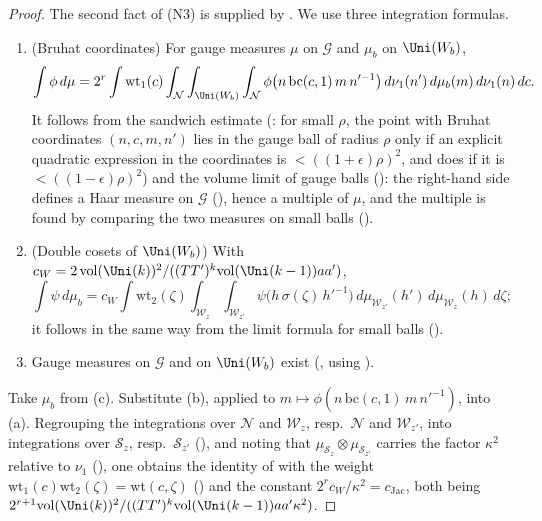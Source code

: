 \begin{proof}
The second fact of (N3) is supplied by . We use three integration formulas.
\begin{enumerate}[label=(\alph*)]
\item (Bruhat coordinates) For gauge measures $\mu$ on $\mathcal G$ and $\mu_b$ on $\Uni(W_b)$,
\[
\int\phi\,d\mu=2^r\int\mathrm{wt}_1(c)\int_{\mathcal N}\int_{\Uni(W_b)}\int_{\mathcal N}\phi\bigl(n\,\mathrm{bc}(c,1)\,m\,
n'^{-1}\bigr)\,d\nu_1(n')\,d\mu_b(m)\,d\nu_1(n)\,dc .
\]
It follows from the sandwich estimate (: for small $\rho$, the point with Bruhat
coordinates $(n,c,m,n')$ lies in the gauge ball of radius $\rho$ only if an explicit quadratic expression in the coordinates
is $<((1+\epsilon)\rho)^2$, and does if it is $<((1-\epsilon)\rho)^2$) and the volume limit of gauge balls
(): the right-hand side defines a Haar measure on $\mathcal G$
(), hence a multiple of $\mu$, and the multiple is found by comparing the two
measures on small balls ().
\item (Double cosets of $\Uni(W_b)$) With $c_W=2\,\mathrm{vol}(\Uni(k))^2/((TT')^k\mathrm{vol}(\Uni(k-1))aa')$,
\[
\int\psi\,d\mu_b=c_W\int\mathrm{wt}_2(\zeta)\int_{\mathcal W_z}\int_{\mathcal W_{z'}}\psi\bigl(h\,\sigma(\zeta)\,h'^{-1}\bigr)\,
d\mu_{\mathcal W_{z'}}(h')\,d\mu_{\mathcal W_z}(h)\,d\zeta ;
\]
it follows in the same way from the limit formula for small balls
().
\item Gauge measures on $\mathcal G$ and on $\Uni(W_b)$ exist (,
using ).
\end{enumerate}
Take $\mu_b$ from (c). Substitute (b), applied to $m\mapsto\phi(n\,\mathrm{bc}(c,1)\,m\,n'^{-1})$, into (a). Regrouping the
integrations over $\mathcal N$ and $\mathcal W_z$, resp.\ $\mathcal N$ and $\mathcal W_{z'}$, into integrations over
$\mathcal S_z$, resp.\ $\mathcal S_{z'}$ (), and noting that
$\mu_{\mathcal S_z}\otimes\mu_{\mathcal S_{z'}}$ carries the factor $\kappa^2$ relative to $\nu_1$
(), one obtains the identity of  with the weight
$\mathrm{wt}_1(c)\mathrm{wt}_2(\zeta)=\mathrm{wt}(c,\zeta)$ ()
and the constant $2^rc_W/\kappa^2=c_{\mathrm{Jac}}$, both being
$2^{r+1}\mathrm{vol}(\Uni(k))^2/((TT')^k\mathrm{vol}(\Uni(k-1))aa'\kappa^2)$.
\end{proof}

